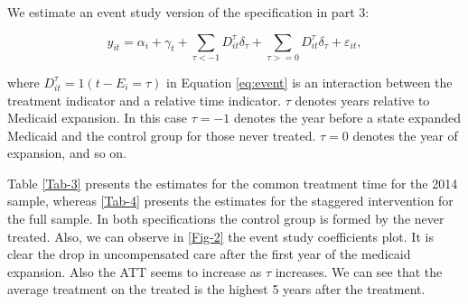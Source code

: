 \documentclass[
  12pt,
]{article}
\begin{document}
We estimate an event study version of the specification in part 3:

\begin{equation}
\label{eq:event}
y_{it} = \alpha_{i} + \gamma_{t} +\sum_{\tau < -1} D_{it}^{\tau} \delta_{\tau} + \sum_{\tau>=0} D_{it}^{\tau} \delta_{\tau} + \varepsilon_{it},
\end{equation}

where \(D_{it}^{\tau} = 1(t-E_{i}=\tau)\) in Equation \ref{eq:event} is
an interaction between the treatment indicator and a relative time
indicator. \(\tau\) denotes years relative to Medicaid expansion. In
this case \(\tau=-1\) denotes the year before a state expanded Medicaid
and the control group for those never treated. \(\tau=0\) denotes the
year of expansion, and so on.

Table \ref{Tab-3} presents the estimates for the common treatment time
for the 2014 sample, whereas \ref{Tab-4} presents the estimates for the
staggered intervention for the full sample. In both specifications the
control group is formed by the never treated. Also, we can observe in
\ref{Fig-2} the event study coefficients plot. It is clear the drop in
uncompensated care after the first year of the medicaid expansion. Also
the ATT seems to increase as \(\tau\) increases. We can see that the
average treatment on the treated is the highest 5 years after the
treatment.
\end{document}
